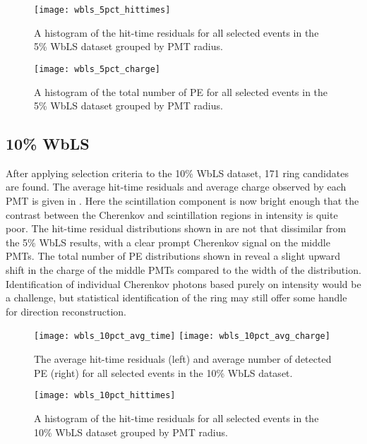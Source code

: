 \begin{figure}
\centering
\texttt{[image: wbls\_5pct\_hittimes]}
\caption{\label{fig:wbls5pct_tresid}A histogram of the hit-time residuals for all selected events in the 5\% WbLS dataset grouped by PMT radius.}
\end{figure}

\begin{figure}
\centering
\texttt{[image: wbls\_5pct\_charge]}
\caption{\label{fig:wbls5pct_totalq}A histogram of the total number of PE for all selected events in the 5\% WbLS dataset grouped by PMT radius.}
\end{figure}

\clearpage

\subsection{10\% WbLS}

After applying selection criteria to the 10\% WbLS dataset, 171 ring candidates are found.
The average hit-time residuals and average charge observed by each PMT is given in .
Here the scintillation component is now bright enough that the contrast between the Cherenkov and scintillation regions in intensity is quite poor.
The hit-time residual distributions shown in  are not that dissimilar from the 5\% WbLS results, with a clear prompt Cherenkov signal on the middle PMTs.
The total number of PE distributions shown in  reveal a slight upward shift in the charge of the middle PMTs compared to the width of the distribution.
Identification of individual Cherenkov photons based purely on intensity would be a challenge, but statistical identification of the ring may still offer some handle for direction reconstruction.

\begin{figure}
\centering
\texttt{[image: wbls\_10pct\_avg\_time]}
\hfill
\texttt{[image: wbls\_10pct\_avg\_charge]}
\caption{\label{fig:wbls10pct_avg}The average hit-time residuals (left) and average number of detected PE (right) for all selected events in the 10\% WbLS dataset.}
\end{figure}

\begin{figure}
\centering
\texttt{[image: wbls\_10pct\_hittimes]}
\caption{\label{fig:wbls10pct_tresid}A histogram of the hit-time residuals for all selected events in the 10\% WbLS dataset grouped by PMT radius.}
\end{figure}

